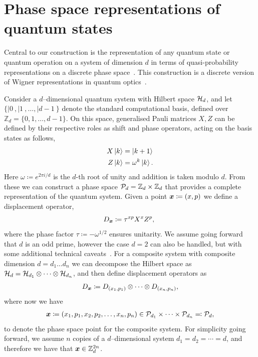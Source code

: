 \documentclass[pra,
aps,
twocolumn,
superscriptaddress,
groupedaddress,
nofootinbib,
reprint
]{revtex4-1}
\begin{document}
\section{Phase space representations of quantum states}
\label{sec:ps}

Central to our construction is the representation of any quantum state or quantum operation on a system of dimension $d$ in terms of quasi-probability representations on a discrete phase space~\cite{Ferrie_2008}. This construction is a discrete version of Wigner representations in quantum optics~\cite{Wigner_1932, Vourdas_2004}.

Consider a $d$--dimensional quantum system with Hilbert space $\H_d$, and let $\{ |0\>, |1\>, \dots , |d-1\>\}$ denote the standard computational basis, defined over $\mathbb{Z}_d = \{ 0, 1, \dots,d-1 \}$. On this space, generalised Pauli matrices $X, Z$ can be defined by their respective roles as shift and phase operators, acting on the basis states as follows,
\begin{align}
    X \ket{k} &= \ket{k + 1} \label{eq:xpauli}\\
	Z \ket{k} &= \omega^k \ket{k}. \label{eq:zpauli}
\end{align}
Here $\omega \coloneqq e^{2\pi i/d}$ is the $d$-th root of unity and addition is taken modulo $d$. From these we can construct a phase space $\cal{P}_d = \mathbb{Z}_d \times \mathbb{Z}_d$ that provides a complete representation of the quantum system. Given a point $\bmx \coloneqq (x, p)$ we define a displacement operator, 
\begin{equation}\label{eq:ddef}
    D_{\bmx} \coloneqq \tau^{x p} X^{x} Z^{p},\ 
\end{equation}
where the phase factor $\tau \coloneqq -\omega^{1/2}$ ensures unitarity. We assume going forward that $d$ is an odd prime, however the case $d=2$ can also be handled, but with some additional technical caveats~\cite{Appleby_2005}. For a composite system with composite dimension $d = d_1 \dots d_n$ we can decompose the Hilbert space as $\cal{H}_d = \cal{H}_{d_1} \otimes \dots \otimes \cal{H}_{d_n}$, and then define displacement operators as
\begin{equation}\label{eq:composited}
    D_{\bmx} \coloneqq D_{(x_1, p_1)} \otimes \dots \otimes D_{(x_n, p_n)},
\end{equation}
where now we have
\begin{align*}
	\bmx \coloneqq (x_1, p_1, x_2, p_2, \dots, x_n, p_n) \in \cal{P}_{d_1} \times \dots \times \cal{P}_{d_n} \eqqcolon  \cal{P}_d,
\end{align*}
to denote the phase space point for the composite system. 
For simplicity going forward, we assume $n$ copies of a $d$--dimensional system $d_1=d_2 = \cdots = d$, and therefore we have that $\x \in \mathbb{Z}_d^{2n}$.
\end{document}

